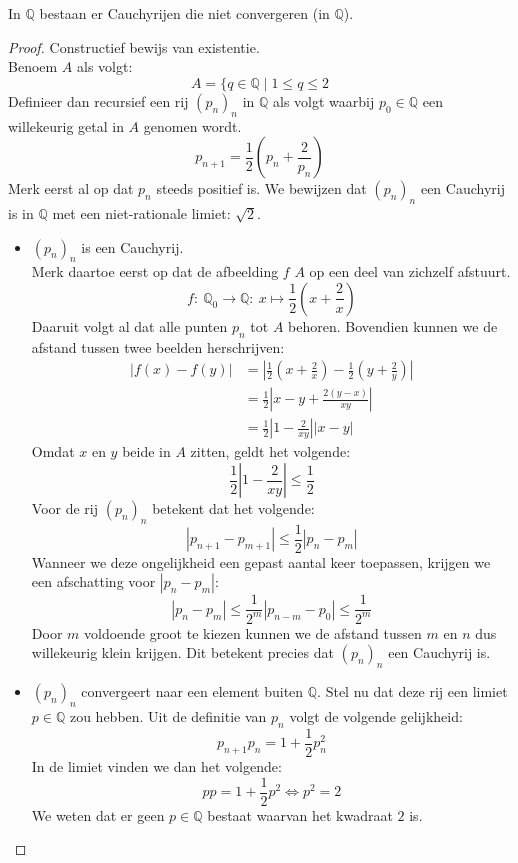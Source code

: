 \documentclass[main.tex]{subfiles}
\begin{document}
\begin{bpr}
  In $\mathbb{Q}$ bestaan er Cauchyrijen die niet convergeren (in $\mathbb{Q}$).

  \begin{proof}
    Constructief bewijs van existentie.\\
    Benoem $A$ als volgt:
    \[ A = \{ q \in \mathbb{Q} \mid 1 \le q \le 2 \]
    Definieer dan recursief een rij $(p_{n})_{n}$ in $\mathbb{Q}$ als volgt waarbij $p_{0}\in\mathbb{Q}$ een willekeurig getal in $A$ genomen wordt.
    \[ p_{n+1} = \frac{1}{2}\left( p_{n} + \frac{2}{p_{n}} \right) \]
    Merk eerst al op dat $p_{n}$ steeds positief is.
    We bewijzen dat $(p_{n})_{n}$ een Cauchyrij is in $\mathbb{Q}$ met een niet-rationale limiet: $\sqrt{2}$.
    \begin{itemize}
    \item $(p_{n})_{n}$ is een Cauchyrij.\\
      Merk daartoe eerst op dat de afbeelding $f$ $A$ op een deel van zichzelf afstuurt.
      \[ f:\ \mathbb{Q}_{0} \rightarrow \mathbb{Q}:\ x \mapsto \frac{1}{2}\left(x+\frac{2}{x}\right) \]
      Daaruit volgt al dat alle punten $p_{n}$ tot $A$ behoren.
      Bovendien kunnen we de afstand tussen twee beelden herschrijven:
      \[
      \begin{array}{rl}
        |f(x) - f(y)| &=
        \left| \frac{1}{2}\left(x+\frac{2}{x}\right) - \frac{1}{2}\left(y+\frac{2}{y}\right) \right|\\
        &= \frac{1}{2} \left| x-y + \frac{2(y-x)}{xy} \right|\\
        &= \frac{1}{2} \left| 1 - \frac{2}{xy}\right| |x-y|
      \end{array}
      \]
      Omdat $x$ en $y$ beide in $A$ zitten, geldt het volgende:
      \[ \frac{1}{2} \left| 1 - \frac{2}{xy}\right| \le \frac{1}{2} \]
      Voor de rij $(p_{n})_{n}$ betekent dat het volgende:
      \[ |p_{n+1} - p_{m+1}| \le \frac{1}{2}|p_{n}-p_{m}| \]
      Wanneer we deze ongelijkheid een gepast aantal keer  toepassen, krijgen we een afschatting voor $|p_{n}-p_{m}|$:
      \[ |p_{n}-p_{m}| \le \frac{1}{2^{m}}|p_{n-m}-p_{0}| \le \frac{1}{2^{m}} \]
      Door $m$ voldoende groot te kiezen kunnen we de afstand tussen $m$ en $n$ dus willekeurig klein krijgen.
      Dit betekent precies dat $(p_{n})_{n}$ een Cauchyrij is.
    \item $(p_{n})_{n}$ convergeert naar een element buiten $\mathbb{Q}$.
      Stel nu dat deze rij een limiet $p \in \mathbb{Q}$ zou hebben.
      Uit de definitie van $p_{n}$ volgt de volgende gelijkheid:
      \[ p_{n+1}p_{n} = 1 + \frac{1}{2}p_{n}^{2} \]
      In de limiet vinden we dan het volgende:
      \[ pp = 1 + \frac{1}{2}p^{2} \Leftrightarrow p^{2} = 2 \]
      We weten dat er geen $p\in\mathbb{Q}$ bestaat waarvan het kwadraat $2$ is.\needed
    \end{itemize}
  \end{proof}
\end{bpr}
\end{document}
